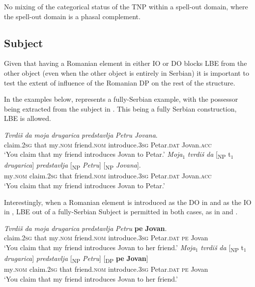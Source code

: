 \documentclass[output=paper,
hidelinks,
newtxmath,
]{langscibook}
\begin{document}
\ea\label{ex26}
  No mixing of the categorical status of the TNP within a spell-out domain, where the spell-out domain is a phasal complement.
\z

\subsection{Subject}\label{s5.3}

Given that having a Romanian element in either IO or DO blocks LBE from the other object (even when the other object is entirely in Serbian) it is important to test the extent of influence of the Romanian DP on the rest of the structure.

In the examples below,  represents a fully-Serbian example, with the possessor being extracted from the subject in . This being a fully Serbian construction, LBE is allowed.

\ea \label{ex27}
	\ea\label{ex27a}
    \gll \textit{Tvrdiš} \textit{da} \textit{moja} \textit{drugarica} \textit{predstavlja} \textit{Petru} \textit{Jovana}.\\          
         claim\textsc{.2sg} that my\textsc{.nom} friend\textsc{.nom} introduce\textsc{.3sg} Petar\textsc{.dat} Jovan\textsc{.acc}\\
         \glt `You claim that my friend introduces Jovan to Petar.'
	\ex\label{ex27b}
    \gll \textit{Moja}$_1$ \textit{tvrdiš} \textit{da} [\textsubscript{NP} t$_1$ \textit{drugarica}] \textit{predstavlja} [\textsubscript{NP} \textit{Petru}] [\textsubscript{NP} \textit{Jovana}].\\
         my\textsc{.nom} claim\textsc{.2sg} that {} {} friend\textsc{.nom} introduce\textsc{.3sg} {} Petar\textsc{.dat} {} Jovan\textsc{.acc}\\ 
         \glt `You claim that my friend introduces Jovan to Petar.'
	\z
\z

\noindent Interestingly, when a Romanian element is introduced as the DO in  and as the IO in , LBE out of a fully-Serbian Subject is permitted in both cases, as in  and .

\ea \label{ex28}
	\ea\label{ex28a}
    \gll \textit{Tvrdiš} \textit{da} \textit{moja} \textit{drugarica} \textit{predstavlja} \textit{Petru} \textbf{pe} \textbf{Jovan}.\\          
         claim\textsc{.2sg} that my\textsc{.nom} friend\textsc{.nom} introduce\textsc{.3sg} Petar\textsc{.dat} \textsc{pe} Jovan\\
         \glt `You claim that my friend introduces Jovan to her friend.'
	\ex\label{ex28b}
    \gll \textit{Moja}$_1$ \textit{tvrdiš} \textit{da} [\textsubscript{NP} t$_1$ \textit{drugarica}] \textit{predstavlja} [\textsubscript{NP} \textit{Petru}] [\textsubscript{DP} \textbf{pe} \textbf{Jovan}]\\
         my\textsc{.nom} claim\textsc{.2sg} that {} {} friend\textsc{.nom} introduce\textsc{.3sg} {} Petar\textsc{.dat} {} \textsc{pe} Jovan\\ 
                  \glt `You claim that my friend introduces Jovan to her friend.'
	\z
\z
\end{document}
